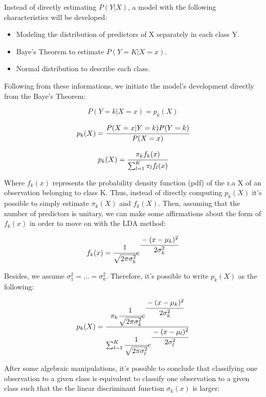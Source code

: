 \documentclass[conference]{IEEEtran}
\begin{document}
Instead of directly estimating $P(Y|X)$, a model with the following characteristics will 
be developed:

\begin{itemize}
    \item Modeling the distribution of predictors of X separately in each class Y.
    \item Baye's Theorem to estimate $P(Y = K|X = x)$.
    \item Normal distribution to describe each class.
\end{itemize}

Following from these informations, we initiate the model's development directly from the 
Baye's Theorem:

\begin{equation}
    P(Y=k|X=x) = p_k(X) \label{eq4}
\end{equation}

\begin{equation}
    p_k(X) = \cfrac{P(X=x|Y=k)P(Y = k)}{P(X=x)} \label{eq5}
\end{equation}

\begin{equation}
    p_k(X) = \cfrac{\pi_k f_k(x)}{\sum^{K}_{l=1}\pi_lf_l(x)} \label{eq6}
\end{equation}

Where $f_k(x)$ represents the probability density function (pdf) of the r.a X of 
an observation belonging to class K. Thus, instead of directly computing $p_k(X)$ it's 
possible to simply estimate $\pi_k(X)$ and $f_k(X)$. Then, assuming that the number of 
predictors is unitary, we can make some affirmations about the form of $f_k(x)$ in order
to move on with the LDA method:

\begin{equation}
    f_k(x) = \cfrac{1}{\sqrt{2\pi\sigma^2_k}}e^{\cfrac{-(x-\mu_k)^2}{2\sigma^2_k}} \label{eq7}
\end{equation}

Besides, we assume $\sigma_1^2=...=\sigma_k^2$. Therefore, it's possible to write $p_k(X)$ 
as the following:

\begin{equation}
    p_k(X) = \cfrac{\pi_k \cfrac{1}{\sqrt{2\pi\sigma^2_k}}e^{\cfrac{-(x-\mu_k)^2}{2\sigma^2_k}}}{\sum^K_{l=1}\cfrac{1}{\sqrt{2\pi\sigma^2_l}}e^{\cfrac{-(x-\mu_l)^2}{2\sigma^2_l}}} \label{eq8}
\end{equation}

After some algebraic manipulations, it's possible to conclude that classifying one
observation to a given class is equivalent to classify one observation to a given class 
such that the the linear discriminant function $\sigma_k(x)$ is larger:
\end{document}
